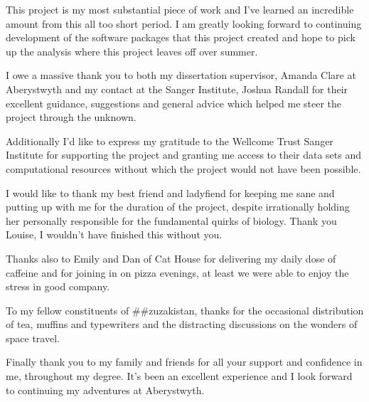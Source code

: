 \begin{acknowledgements}

This project is my most substantial piece of work and I've learned an incredible
amount from this all too short period. I am greatly looking forward to continuing
development of the software packages that this project created and hope to pick
up the analysis where this project leaves off over summer.

I owe a massive thank you to both my dissertation supervisor,
Amanda Clare at Aberystwyth and my contact at the Sanger Institute, Joshua
Randall for their excellent guidance, suggestions and general advice which
helped me steer the project through the unknown.

Additionally I'd like to express my gratitude to the Wellcome Trust Sanger Institute for
supporting the project and granting me access to their data sets and
computational resources without which the project would not have been possible.

I would like to thank my best friend and ladyfiend for keeping me sane and
putting up with me for the duration of the project, despite irrationally holding her
personally responsible for the fundamental quirks of biology. Thank you Louise, I
wouldn't have finished this without you.

Thanks also to Emily and Dan of Cat House for delivering my daily dose of
caffeine and for joining in on pizza evenings, at least we were able to enjoy the
stress in good company.

To my fellow constituents of \#\#zuzakistan, thanks for the occasional
distribution of tea, muffins and typewriters and the distracting discussions
on the wonders of space travel.


Finally thank you to my family and friends for all your support and confidence
in me, throughout my degree. It's been an excellent experience and I look forward
to continuing my adventures at Aberystwyth.

\end{acknowledgements}
